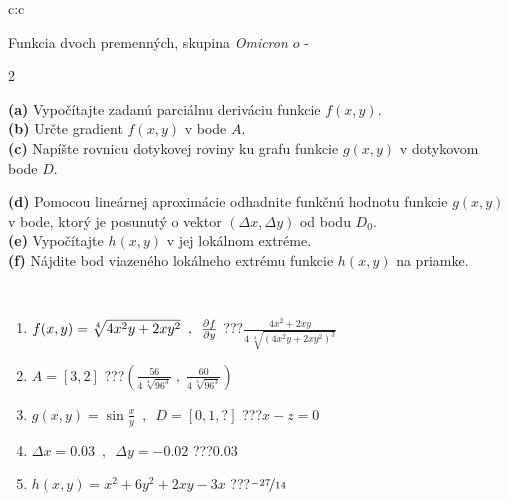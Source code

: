 \documentclass[10pt]{report}
\newcommand\omicron{o}
\begin{document}
\begin{tabular}{c:c}
\begin{minipage}[c][104.5mm][t]{0.5\linewidth}
\begin{center}
\vspace{7mm}
{\huge \LARGE Funkcia dvoch premenných, skupina \textit{Omicron $\omicron$} -}\\[5mm]
\begin{minipage}{0.95\linewidth}
\begin{center}
{\small \begin{multicols}{2} \raggedright
\textbf{(a)} Vypočítajte zadanú parciálnu deriváciu funkcie \(f(x,y)\). \\[1mm]
\textbf{(b)} Určte gradient \(f(x,y)\) v bode \(A\). \\[1mm]
\textbf{(c)} Napíšte rovnicu dotykovej roviny ku grafu funkcie \(g(x,y)\) v dotykovom bode \(D\). \par \columnbreak
\textbf{(d)} Pomocou lineárnej aproximácie odhadnite funkčnú hodnotu funkcie \(g(x,y)\) v bode, ktorý je posunutý o vektor \((\Delta x, \Delta y)\) od bodu \(D_0\). \\[1mm]
\textbf{(e)} Vypočítajte \(h(x,y)\) v jej lokálnom extréme. \\[1mm]
\textbf{(f)} Nájdite bod viazeného lokálneho extrému funkcie \(h(x,y)\) na priamke. \\[1mm]
\end{multicols}
}
\end{center}
\end{minipage}
\\[4mm]
\begin{minipage}{0.79\linewidth}
\begin{center}
\begin{varwidth}{\linewidth}
\begin{enumerate}
\normalsizerr
\item $f(x,y) = \sqrt[4]{4x^2y + 2xy^2}\enspace , \enspace \pdv{f}{y}$\quad \dotfill\; ???\;\dotfill \quad $\frac{4x^2+2xy}{4\,\sqrt[4]{(4x^2y+2xy^2)^{3}}}$
\item $A = [3, 2]$\quad \dotfill\; ???\;\dotfill \quad $\left( \frac{56}{4\,\sqrt[4]{96^3}} \;,\; \frac{60}{4\,\sqrt[4]{96^3}} \right)$
\item $g(x,y) = \sin\frac{x}{y} \enspace , \enspace D = [0, 1, ?]$\quad \dotfill\; ???\;\dotfill \quad $x-z=0$
\item $\Delta x = {0.03} \enspace,\enspace \Delta y = {-0.02}$\quad \dotfill\; ???\;\dotfill \quad $0.03$
\item $h(x,y) = x^2+6y^2+2xy-3x$\quad \dotfill\; ???\;\dotfill \quad $\nicefrac{-27}{14}$

\end{enumerate}
\end{varwidth}
\end{center}
\end{minipage}
\end{center}
\end{minipage}
\end{tabular}
\end{document}

